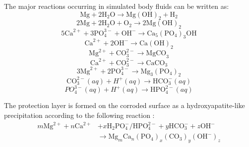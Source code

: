 The major reactions occurring in simulated body fluids can be written as:
\begin{equation}
\mathrm{Mg}+2 \mathrm{H}_{2} \mathrm{O} \rightarrow \mathrm{Mg}(\mathrm{OH})_{2}+\mathrm{H}_{2}
\end{equation}
\begin{equation}
2 \mathrm{Mg}+2 \mathrm{H}_{2} \mathrm{O}+\mathrm{O}_{2} \rightarrow 2 \mathrm{Mg}(\mathrm{OH})_{2}
\end{equation}
\begin{equation}
5 \mathrm{Ca}^{2+}+3 \mathrm{PO}_{4}^{3-}+\mathrm{OH}^{-} \rightarrow \mathrm{Ca}_{5}\left(\mathrm{PO}_{4}\right)_{3} \mathrm{OH}
\end{equation}
\begin{equation}
\mathrm{Ca}^{2+}+2 \mathrm{OH}^{-} \rightarrow \mathrm{Ca}(\mathrm{OH})_{2}
\end{equation}
\begin{equation}
\mathrm{Mg}^{2+}+\mathrm{CO}_{3}^{2-} \rightarrow \mathrm{MgCO}_{3}
\end{equation}
\begin{equation}
\mathrm{Ca}^{2+}+\mathrm{CO}_{3}^{2-} \rightarrow \mathrm{CaCO}_{3}
\end{equation}
\begin{equation}
 3 \mathrm{Mg}^{2+}+2 \mathrm{PO}_{4}^{3-} \rightarrow \mathrm{Mg}_{3}\left(\mathrm{PO}_{4}\right)_{2}
\end{equation}
\begin{equation}
\mathrm{CO}_{3}^{2-}(a q)+H^{+}(a q) \rightarrow \mathrm{HCO}_{3}^{-}(a q)
\end{equation}
\begin{equation}
P O_{4}^{3-}(a q)+H^{+}(a q)\rightarrow \mathrm{HPO}_{4}^{2-}(a q)
\end{equation}

The protection layer is formed on the corroded surface as a hydroxyapatite-like precipitation according to the following reaction \cite{Atrens2015,Song2009,Silva2018,Jiang2019}:
\begin{equation} \label{eq:kinetics_hydrox_react}
\begin{aligned}
m \mathrm{Mg}^{2+}+n \mathrm{Ca}^{2+}&+x \mathrm{H}_{2} \mathrm{PO}_{4}^{-} / \mathrm{HPO}_{4}^{2-}+y \mathrm{HCO}_{3}^{-}+z \mathrm{OH}^{-}\\
& \rightarrow \mathrm{Mg}_{m} \mathrm{Ca}_{n}\left(\mathrm{PO}_{4}\right)_{x}\left(\mathrm{CO}_{3}\right)_{y}\left(\mathrm{OH}^{-}\right)_{z}
\end{aligned}
\end{equation}

